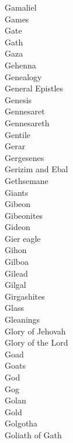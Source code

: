 Gamaliel  \\
Games  \\
Gate  \\
Gath  \\
Gaza  \\
Gehenna  \\
Genealogy  \\
General Epistles  \\
Genesis  \\
Gennesaret  \\
Gennesareth  \\
Gentile  \\
Gerar  \\
Gergesenes  \\
Gerizim and Ebal  \\
Gethsemane  \\
Giants  \\
Gibeon  \\
Gibeonites  \\
Gideon  \\
Gier eagle  \\
Gihon  \\
Gilboa  \\
Gilead  \\
Gilgal  \\
Girgashites  \\
Glass  \\
Gleanings  \\
Glory of Jehovah  \\
Glory of the Lord  \\
Goad  \\
Goats  \\
God  \\
Gog  \\
Golan  \\
Gold  \\
Golgotha  \\
Goliath of Gath  \\
